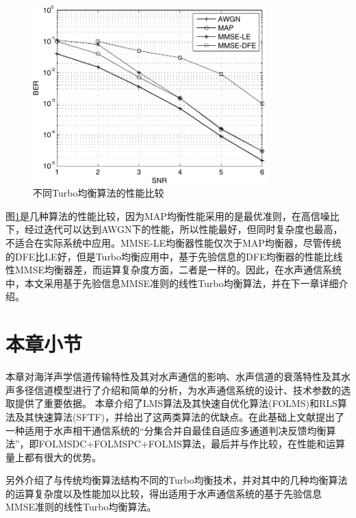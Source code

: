 \begin{figure}[htb]
  \begin{center}
    \includegraphics[width=0.8\textwidth]{images/diffcmp.pdf}
  \end{center}
  \caption{不同Turbo均衡算法的性能比较}
  \label{fig:2.5}
\end{figure}
图\ref{fig:2.5}是几种算法的性能比较，因为MAP均衡性能采用的是最优准则，在高信噪比下，经过迭代可以达到AWGN下的性能，所以性能最好，但同时复杂度也最高，不适合在实际系统中应用。MMSE-LE均衡器性能仅次于MAP均衡器，尽管传统的DFE比LE好，但是Turbo均衡应用中，基于先验信息的DFE均衡器的性能比线性MMSE均衡器差，而运算复杂度方面，二者是一样的。因此，在水声通信系统中，本文采用基于先验信息MMSE准则的线性Turbo均衡算法，并在下一章详细介绍。
\section{本章小节}
本章对海洋声学信道传输特性及其对水声通信的影响、水声信道的衰落特性及其水声多径信道模型进行了介绍和简单的分析，为水声通信系统的设计、技术参数的选取提供了重要依据。
本章介绍了LMS算法及其快速自优化算法(FOLMS)和RLS算法及其快速算法(SFTF)，并给出了这两类算法的优缺点。在此基础上文献提出了一种适用于水声相干通信系统的“分集合并自最佳自适应多通道判决反馈均衡算法”，即FOLMSDC+FOLMSPC+FOLMS算法，最后并与作比较，在性能和运算量上都有很大的优势。

另外介绍了与传统均衡算法结构不同的Turbo均衡技术，并对其中的几种均衡算法的运算复杂度以及性能加以比较，得出适用于水声通信系统的基于先验信息MMSE准则的线性Turbo均衡算法。
%
\clearpage{\pagestyle{empty}\cleardoublepage}
